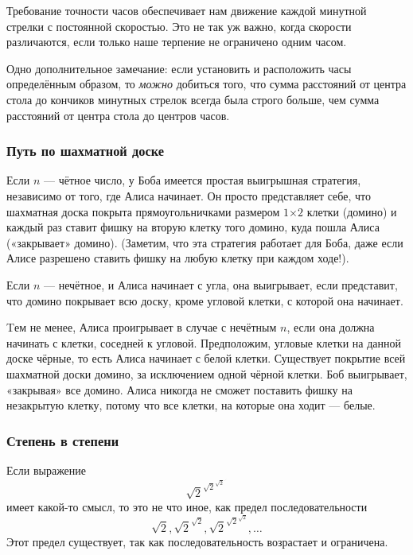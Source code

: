 Требование точности часов обеспечивает нам движение каждой минутной стрелки с постоянной скоростью.
Это не так уж важно, когда скорости различаются, если только наше терпение не ограничено одним часом.

Одно дополнительное замечание: если установить и расположить часы определённым образом,
то \emph{можно} добиться того, что сумма расстояний от центра стола до кончиков минутных стрелок всегда была строго больше, чем сумма расстояний от центра стола до центров часов.\heart


\subsubsection*{Путь по шахматной доске} %

Если $n$ --- чётное число, у Боба имеется простая выигрышная стратегия, независимо от того, где Алиса начинает.
Он просто представляет себе, что шахматная доска покрыта прямоугольничками размером $1{\times2}$ клетки (домино) и каждый раз ставит фишку на вторую клетку того домино, куда пошла Алиса («закрывает» домино). %
(Заметим, что эта стратегия работает для Боба, даже если Алисе разрешено ставить фишку на любую клетку при каждом ходе!).

Если $n$ --- нечётное, и Алиса начинает с угла, она выигрывает, если представит, что домино покрывает всю доску, кроме угловой клетки, с которой она начинает.

Tем не менее, Алиса проигрывает в случае с нечётным $n$, если она должна начинать с клетки, соседней к угловой.
Предположим, угловые клетки на данной доске чёрные, то есть Алиса начинает с белой клетки.
Существует покрытие всей шахматной доски домино, за исключением одной чёрной клетки.
Боб выигрывает, «закрывая» все домино.
Алиса
никогда не сможет поставить фишку на незакрытую клетку, потому что все клетки, на которые она ходит --- белые.\heart


\subsubsection*{Степень в степени} %

Если выражение
$${\sqrt{2}}^{{\sqrt{2}}^{{\sqrt{2}}^{{\cdot}^{\cdot^{\cdot}}}}}$$
имеет какой-то смысл, то это не что иное, как предел последовательности
$${\sqrt{2}}, {\sqrt{2}}^{{\sqrt{2}}}, {\sqrt{2}}^{{\sqrt{2}}^{{\sqrt{2}}}},\dots$$
Этот предел существует, так как последовательность возрастает и ограничена.

